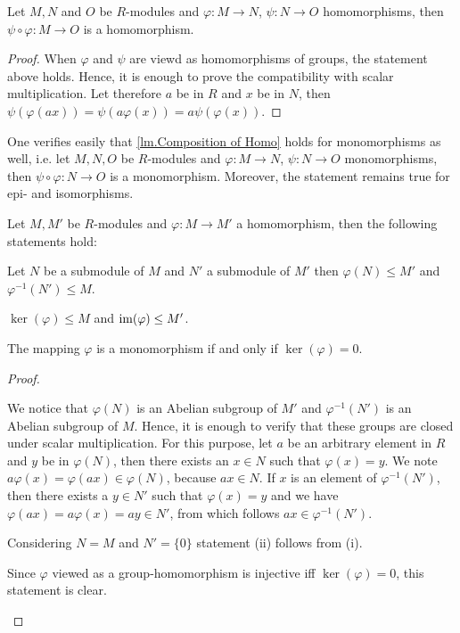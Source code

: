 \begin{lem}\label{lm.Composition of Homo} Let $M, N$ and $O$ be $R$-modules and $\varphi\colon M\rightarrow N$, $\psi\colon N\rightarrow O$ homomorphisms, then $\psi\circ\varphi\colon M\rightarrow O$ is a homomorphism.
\end{lem}
\begin{proof}
When $\varphi$ and $\psi$ are viewd as homomorphisms of groups, the statement above holds. Hence, it is enough to prove the compatibility with scalar multiplication. Let therefore $a$ be in $R$ and $x$ be in $N$, then $\psi(\varphi(ax))=\psi(a\varphi(x))=a\psi(\varphi(x))$.
\end{proof}

One verifies easily that \cref{lm.Composition of Homo} holds for monomorphisms as well, i.e. let $M, N, O$ be $R$-modules and $\varphi\colon M\rightarrow N$, $\psi\colon N\rightarrow O$ monomorphisms, then $\psi\circ\varphi\colon N\rightarrow O$ is a monomorphism. Moreover, the statement remains true for epi- and isomorphisms.

\begin{lem}
Let $M,M'$ be $R$-modules and $\varphi\colon M\rightarrow M'$ a homomorphism, then the following statements hold:
\begin{thmlist}
\item Let $N$ be a submodule of $M$ and $N'$ a submodule of $M'$ then $\varphi(N)\leq M'$ and $\varphi^{-1}(N') \leq M$.
\item $\ker(\varphi)\leq M$ and $\operatorname{im}(\varphi)\leq M'$.
\item The mapping $\varphi$ is a monomorphism if and only if $\ker(\varphi)={0}$.
\end{thmlist}
\end{lem}
\begin{proof}
\begin{plist}
\item We notice that $\varphi(N)$ is an Abelian subgroup of $M'$ and $\varphi^{-1}(N')$ is an Abelian subgroup of $M$. Hence, it is enough to verify that these groups are closed under scalar multiplication. For this purpose, let $a$ be an arbitrary element in $R$ and $y$ be in $\varphi(N)$, then there exists an $x\in N$ such that $\varphi(x)=y$. We note $a\varphi(x)=\varphi(ax)\in\varphi(N)$, because $ax\in N$. If $x$ is an element of $\varphi^{-1}(N')$, then there exists a $y\in N'$ such that $\varphi(x)=y$ and we have $\varphi(ax)=a\varphi(x)=ay\in N'$, from which follows $ax\in \varphi^{-1}(N')$.
\item Considering $N=M$ and $N'=\lbrace 0\rbrace$ statement (ii) follows from (i).
\item Since $\varphi$ viewed as a group-homomorphism is injective iff $\ker(\varphi)={0}$, this statement is clear.
\end{plist}
\end{proof}

